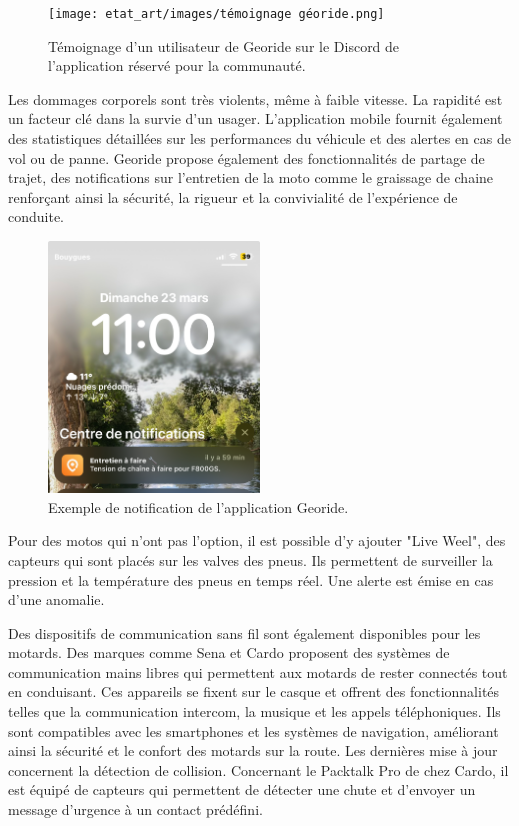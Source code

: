 \begin{figure}[H]
    \centering
    \texttt{[image: etat\_art/images/témoignage géoride.png]} 
    \caption{Témoignage d'un utilisateur de Georide sur le Discord de l'application réservé pour la communauté.}
    \label{temoignage}
\end{figure}
Les dommages corporels sont très violents, même à faible vitesse. La rapidité est un facteur clé dans la survie d'un usager. L’application mobile fournit également des statistiques détaillées sur les performances du véhicule et des alertes en cas de vol ou de panne. Georide propose également des fonctionnalités de partage de trajet, des notifications sur l'entretien de la moto comme le graissage de chaine renforçant ainsi la sécurité, la rigueur et la convivialité de l’expérience de conduite.
\begin{figure}[H]
    \centering
    \includegraphics[width=0.5\textwidth]{images/notification_georide.jpg} 
    \caption{Exemple de notification de l'application Georide.}
\end{figure}
Pour des motos qui n'ont pas l'option, il est possible d'y ajouter "Live Weel", des capteurs qui sont placés sur les valves des pneus. Ils permettent de surveiller la pression et la température des pneus en temps réel. Une alerte est émise en cas d'une anomalie.
\vspace{0.5cm}

Des dispositifs de communication sans fil sont également disponibles pour les motards. Des marques comme Sena et Cardo\cite{cardo} proposent des systèmes de communication mains libres qui permettent aux motards de rester connectés tout en conduisant. Ces appareils se fixent sur le casque et offrent des fonctionnalités telles que la communication intercom, la musique et les appels téléphoniques. Ils sont compatibles avec les smartphones et les systèmes de navigation, améliorant ainsi la sécurité et le confort des motards sur la route. Les dernières mise à jour concernent la détection de collision. Concernant le Packtalk Pro de chez Cardo, il est équipé de capteurs qui permettent de détecter une chute et d'envoyer un message d'urgence à un contact prédéfini.\\

